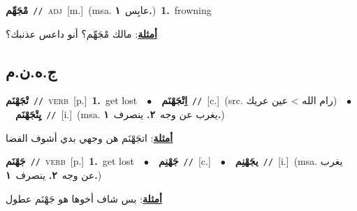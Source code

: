 \documentclass[10pt,a4paper,twoside]{article} %
\begin{document}
\begin{multicols}{2}
{\setlength\topsep{0pt}\textbf{\foreignlanguage{arabic}{مْجَهِّم}}\ {\color{gray}\texttt{//}\color{black}}\ \textsc{adj}\ [m.]\ \color{gray}(msa. \foreignlanguage{arabic}{عابِس}~\foreignlanguage{arabic}{\textbf{١.}})\color{black}\ \textbf{1.}~frowning\  \begin{flushright}\color{gray}\foreignlanguage{arabic}{\textbf{\underline{\foreignlanguage{arabic}{أمثلة}}}: مالك مْجَهِّم؟ أنو داعس عذنبك؟}\end{flushright}\color{black}} \vspace{2mm}

\vspace{-3mm}
\subsection*{\color{blue}\foreignlanguage{arabic}{ج.ه.ن.م}\color{blue}{}} 

{\setlength\topsep{0pt}\textbf{\foreignlanguage{arabic}{تْجَهْنَم}}\ {\color{gray}\texttt{//}\color{black}}\ \textsc{verb}\ [p.]\ \textbf{1.}~get lost\ \ $\bullet$\ \ \setlength\topsep{0pt}\textbf{\foreignlanguage{arabic}{اِتْجَهْنَم}}\ {\color{gray}\texttt{//}\color{black}}\ [c.]\ (src. \color{gray}\foreignlanguage{arabic}{رام الله > عين عريك}\color{black})\ \ $\bullet$\ \ \setlength\topsep{0pt}\textbf{\foreignlanguage{arabic}{يِتْجَهْنَم}}\ {\color{gray}\texttt{//}\color{black}}\ [i.]\ \color{gray}(msa. \foreignlanguage{arabic}{يغرب عن وجه}~\foreignlanguage{arabic}{\textbf{٢.}}  \foreignlanguage{arabic}{ينصرف}~\foreignlanguage{arabic}{\textbf{١.}})\color{black}\  \begin{flushright}\color{gray}\foreignlanguage{arabic}{\textbf{\underline{\foreignlanguage{arabic}{أمثلة}}}: اتجَهْنَم هن وجهي بدي أشوف الفضا}\end{flushright}\color{black}} \vspace{2mm}

{\setlength\topsep{0pt}\textbf{\foreignlanguage{arabic}{جَهْنَم}}\ {\color{gray}\texttt{//}\color{black}}\ \textsc{verb}\ [p.]\ \textbf{1.}~get lost\ \ $\bullet$\ \ \setlength\topsep{0pt}\textbf{\foreignlanguage{arabic}{جَهْنِم}}\ {\color{gray}\texttt{//}\color{black}}\ [c.]\ \ $\bullet$\ \ \setlength\topsep{0pt}\textbf{\foreignlanguage{arabic}{يجَهْنِم}}\ {\color{gray}\texttt{//}\color{black}}\ [i.]\ \color{gray}(msa. \foreignlanguage{arabic}{يغرب عن وجه}~\foreignlanguage{arabic}{\textbf{٢.}}  \foreignlanguage{arabic}{ينصرف}~\foreignlanguage{arabic}{\textbf{١.}})\color{black}\  \begin{flushright}\color{gray}\foreignlanguage{arabic}{\textbf{\underline{\foreignlanguage{arabic}{أمثلة}}}: بس شاف أخوها هو جَهْنَم عطول}\end{flushright}\color{black}} \vspace{2mm}


\end{multicols}
\end{document}
